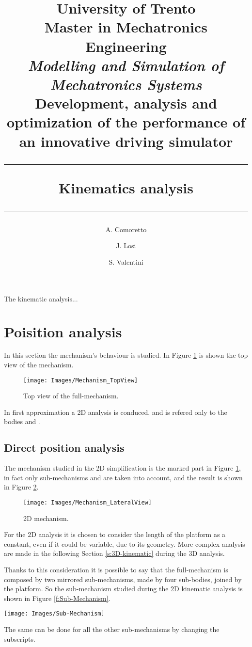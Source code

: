 \documentclass[10.5pt, twocolumn]{article}
\title{
	\large{University of Trento}\\
	\normalsize{Master in Mechatronics Engineering}\\
	\vspace{0.2cm}
	\large{\textit{Modelling and Simulation of Mechatronics Systems}}\\
	\vspace{0.2cm}
	\Large{\textbf{Development, analysis and optimization of the performance of an innovative driving simulator}}\\
	\vspace{0.25cm}
	\hrule
	\vspace{0.2cm}
	\large{\textbf{Kinematics analysis}}\\	%
	\vspace{0.2cm}
	\hrule
}
\author{A. Comoretto \and J. Losi \and S. Valentini}
\date{\vspace{0.5cm}}
\newcommand*\circled[1]{\tikz[baseline=(char.base)]{
	\node[shape=circle,draw,inner sep=2pt] (char) {#1};}}
\begin{document}
\maketitle

The kinematic analysis...

\section{Poisition analysis}
\label{s:Position}
In this section the mechanism's behaviour is studied.
In Figure \ref{f:Top-View} is shown the top view of the mechanism.
\begin{figure}[h!]
	\centering
	\texttt{[image: Images/Mechanism\_TopView]}
	\caption{Top view of the full-mechanism.}
	\label{f:Top-View}
\end{figure}

In first approximation a 2D analysis is conduced, and is refered only to the bodies \circled{A} and \circled{B}.

\subsection{Direct position analysis}
\label{s:Direct-position}
The mechanism studied in the 2D simplification is the marked part in Figure \ref{f:Top-View}, in fact only sub-mechanisms \circled{A} and \circled{B} are taken into account, and the result is shown in Figure \ref{f:2D_Mechanism}.
\begin{figure}[h!]
	\centering
	\texttt{[image: Images/Mechanism\_LateralView]}
	\caption{2D mechanism.}
	\label{f:2D_Mechanism}
\end{figure}

For the 2D analysis it is chosen to consider the length of the platform as a constant, even if it could be variable, due to its geometry.
More complex analysis are made in the following Section \ref{s:3D-kinematic} during the 3D analysis.

Thanks to this consideration it is possible to say that the full-mechanism is composed by two mirrored sub-mechanisms, made by four sub-bodies, joined by the platform.
So the sub-mechanism studied during the 2D kinematic analysis is shown in Figure \ref{f:Sub-Mechanism}.
\begin{figure*}[h!]
	\centering
	\texttt{[image: Images/Sub-Mechanism]}
	\caption{One of the four sub-mechanism of the structure.}
	\label{f:Sub-Mechanism}
\end{figure*}
The same can be done for all the other sub-mechanisms by changing the subscripts.
\end{document}
